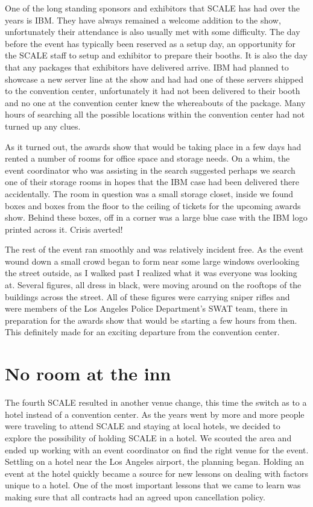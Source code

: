 One of the long standing sponsors and exhibitors that SCALE has had over the
years is IBM. They have always remained a welcome addition to the show,
unfortunately their attendance is also usually met with some difficulty. The
day before the event has typically been reserved as a setup day, an opportunity
for the SCALE staff to setup and exhibitor to prepare their booths. It is also
the day that any packages that exhibitors have delivered arrive. IBM had
planned to showcase a new server line at the show and had had one of these
servers shipped to the convention center, unfortunately it had not been
delivered to their booth and no one at the convention center knew the
whereabouts of the package. Many hours of searching all the possible locations
within the convention center had not turned up any clues.

As it turned out, the awards show that would be taking place in a few days had
rented a number of rooms for office space and storage needs. On a whim, the
event coordinator who was assisting in the search suggested perhaps we search
one of their storage rooms in hopes that the IBM case had been delivered there
accidentally. The room in question was a small storage closet, inside we found
boxes and boxes from the floor to the ceiling of tickets for the upcoming awards
show. Behind these boxes, off in a corner was a large blue case with the IBM
logo printed across it. Crisis averted!

The rest of the event ran smoothly and was relatively incident free. As the
event wound down a small crowd began to form near some large windows overlooking
the street outside, as I walked past I realized what it was everyone was looking
at. Several figures, all dress in black, were moving around on the rooftops of
the buildings across the street. All of these figures were carrying sniper
rifles and were members of the Los Angeles Police Department’s SWAT team, there
in preparation for the awards show that would be starting a few hours from then.
This definitely made for an exciting departure from the convention center.

\section*{No room at the inn}

The fourth SCALE resulted in another venue change, this time the switch as to a
hotel instead of a convention center. As the years went by more and more people
were traveling to attend SCALE and staying at local hotels, we decided to
explore the possibility of holding SCALE in a hotel. We scouted the area and
ended up working with an event coordinator on find the right venue for the
event. Settling on a hotel near the Los Angeles airport, the planning began. 
Holding an event at the hotel quickly became a source for new lessons on dealing
with factors unique to a hotel. One of the most important lessons that we came
to learn was making sure that all contracts had an agreed upon cancellation
policy.

